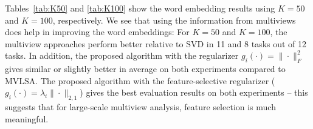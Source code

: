 \documentclass[10pt,journal]{IEEEtran}
\begin{document}
Tables~\ref{tab:K50} and \ref{tab:K100} show the word embedding results using $K=50$ and $K=100$, respectively.
We see that using the information from multiviews does help in improving the word embeddings:
For $K=50$ and $K=100$, the multiview approaches perform better relative to SVD in 11 and 8 tasks out of 12 tasks. 
In addition, the proposed algorithm with the regularizer $g_i(\cdot)=\|\cdot\|_F^2$ gives similar or slightly better in average on both experiments compared to MVLSA.
The proposed algorithm with the feature-selective regularizer ($g_i(\cdot)=\lambda_i\|\cdot\|_{2,1}$) gives the best evaluation results on both experiments -- this suggests that for large-scale multiview analysis, feature selection is much meaningful.


\begin{table}[htbp]
  \centering
  \caption{Evaluation on 12 word embedding tasks; $K=50$.}
  \label{tab:K50}%
\end{table}%
\end{document}
